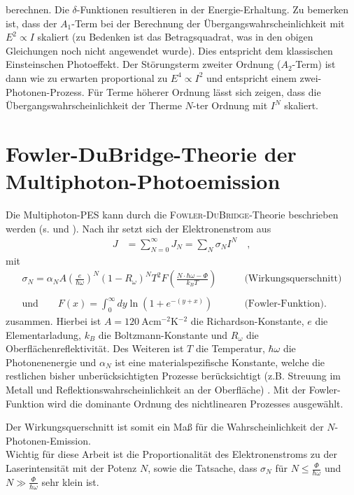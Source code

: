 \documentclass[bachelor,       %
               twoside,        %
               BCOR10mm,       %
               english,ngerman, %
               ]{GAUBM}
\begin{document}
berechnen.
Die $\delta$-Funktionen resultieren in der Energie-Erhaltung.
Zu bemerken ist, dass der $A_1$-Term bei der Berechnung der Übergangswahrscheinlichkeit mit $E^2\propto I$ skaliert (zu Bedenken ist das Betragsquadrat, was in den obigen Gleichungen noch nicht angewendet wurde).
Dies entspricht dem klassischen Einsteinschen Photoeffekt.
Der Störungsterm zweiter Ordnung ($A_2$-Term) ist dann wie zu erwarten proportional zu $E^4\propto I^2$ und entspricht einem zwei-Photonen-Prozess.
Für Terme höherer Ordnung lässt sich zeigen, dass die Übergangswahrscheinlichkeit der Therme $N$-ter Ordnung mit $I^N$ skaliert.


\section{Fowler-DuBridge-Theorie der Multiphoton-Photoemission}
Die Multiphoton-PES kann durch die \textsc{Fowler-DuBridge}-Theorie beschrieben werden (s. \cite{bechtel_1977} und \cite{girardeau_1995}).
Nach ihr setzt sich der Elektronenstrom aus
\begin{align}
	J&=\sum_{N=0}^\infty J_N=\sum_N\sigma_NI^N \quad ,\label{eq:photostrom}
\end{align}
mit
\begin{align}
	\sigma_N=\alpha_NA\left(\frac{e}{\hbar\omega}\right)^N(1-R_\omega)^NT^2F\left(\frac{N\cdot \hbar\omega-\Phi}{k_BT}\right)\qquad&\text{(Wirkungsquerschnitt)}\label{eq:wirkungsquerschnitt}\\\nonumber\\
\text{und}\qquad F(x)=\int_0^\infty dy\ln \left(1+e^{-(y+x)}\right)\qquad &\text{(Fowler-Funktion).}\nonumber
\end{align}
zusammen.
Hierbei ist $A=\SI{120}{\A\cm^{-2}\K^{-2}}$ die Richardson-Konstante, $e$ die Elementarladung, $k_B$ die Boltzmann-Konstante und $R_\omega$ die Oberflächenreflektivität.
Des Weiteren ist $T$ die Temperatur, $\hbar\omega$ die Photonenenergie und $\alpha_N$ ist eine materialspezifische Konstante, welche die restlichen bisher unberücksichtigten Prozesse berücksichtigt (z.B. Streuung im Metall und Reflektionswahrscheinlichkeit an der Oberfläche) \cite{brogle}.
Mit der Fowler-Funktion wird die dominante Ordnung des nichtlinearen Prozesses ausgewählt.

Der Wirkungsquerschnitt ist somit ein Maß für die Wahrscheinlichkeit der $N$-Photonen-Emission.\\

Wichtig für diese Arbeit ist die Proportionalität des Elektronenstroms zu der Laserintensität mit der Potenz $N$, sowie die Tatsache, dass $\sigma_N$ für $N\leq\frac{\Phi}{\hbar\omega}$ und $N\gg\frac{\Phi}{\hbar\omega}$ sehr klein ist.\\\\
\end{document}
